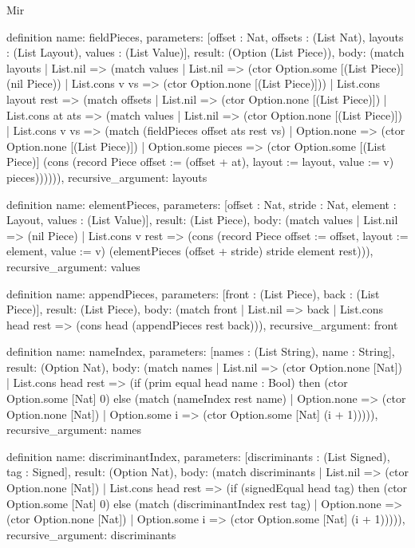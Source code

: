 \begin{lexlean}{Mir}
\begin{semanticmodule}
definition{
  name: fieldPieces,
  parameters: [offset : Nat, offsets : (List Nat), layouts : (List Layout), values : (List Value)],
  result: (Option (List Piece)),
  body: (match layouts
    | List.nil => (match values
      | List.nil => (ctor Option.some [(List Piece)] (nil Piece))
      | List.cons v vs => (ctor Option.none [(List Piece)]))
    | List.cons layout rest => (match offsets
      | List.nil => (ctor Option.none [(List Piece)])
      | List.cons at ats => (match values
        | List.nil => (ctor Option.none [(List Piece)])
        | List.cons v vs => (match (fieldPieces offset ats rest vs)
          | Option.none => (ctor Option.none [(List Piece)])
          | Option.some pieces => (ctor Option.some [(List Piece)] (cons (record Piece {offset := (offset + at), layout := layout, value := v}) pieces)))))),
  recursive_argument: layouts
}

definition{
  name: elementPieces,
  parameters: [offset : Nat, stride : Nat, element : Layout, values : (List Value)],
  result: (List Piece),
  body: (match values
    | List.nil => (nil Piece)
    | List.cons v rest => (cons (record Piece {offset := offset, layout := element, value := v}) (elementPieces (offset + stride) stride element rest))),
  recursive_argument: values
}

definition{
  name: appendPieces,
  parameters: [front : (List Piece), back : (List Piece)],
  result: (List Piece),
  body: (match front
    | List.nil => back
    | List.cons head rest => (cons head (appendPieces rest back))),
  recursive_argument: front
}

definition{
  name: nameIndex,
  parameters: [names : (List String), name : String],
  result: (Option Nat),
  body: (match names
    | List.nil => (ctor Option.none [Nat])
    | List.cons head rest => (if (prim equal head name : Bool) then (ctor Option.some [Nat] 0) else (match (nameIndex rest name)
      | Option.none => (ctor Option.none [Nat])
      | Option.some i => (ctor Option.some [Nat] (i + 1))))),
  recursive_argument: names
}

definition{
  name: discriminantIndex,
  parameters: [discriminants : (List Signed), tag : Signed],
  result: (Option Nat),
  body: (match discriminants
    | List.nil => (ctor Option.none [Nat])
    | List.cons head rest => (if (signedEqual head tag) then (ctor Option.some [Nat] 0) else (match (discriminantIndex rest tag)
      | Option.none => (ctor Option.none [Nat])
      | Option.some i => (ctor Option.some [Nat] (i + 1))))),
  recursive_argument: discriminants
}


\end{semanticmodule}
\end{lexlean}
